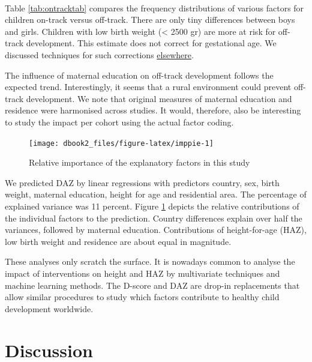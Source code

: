 \documentclass[
]{book}
\begin{document}
~

Table \ref{tab:ontracktab} compares the frequency distributions of various factors for children on-track versus off-track. There are only tiny differences between boys and girls. Children with low birth weight (\textless{} 2500 gr) are more at risk for off-track development. This estimate does not correct for gestational age. We discussed techniques for such corrections \href{https://d-score.org/dbook1/sec-pops.html}{elsewhere}.

The influence of maternal education on off-track development follows the expected trend. Interestingly, it seems that a rural environment could prevent off-track development. We note that original measures of maternal education and residence were harmonised across studies. It would, therefore, also be interesting to study the impact per cohort using the actual factor coding.

\begin{figure}

{\centering \texttt{[image: dbook2\_files/figure-latex/imppie-1]} 

}

\caption{Relative importance of the explanatory factors in this study}\label{fig:imppie}
\end{figure}



We predicted DAZ by linear regressions with predictors country, sex, birth weight, maternal education, height for age and residential area. The percentage of explained variance was 11 percent. Figure \ref{fig:imppie} depicts the relative contributions of the individual factors to the prediction. Country differences explain over half the variances, followed by maternal education. Contributions of height-for-age (HAZ), low birth weight and residence are about equal in magnitude.

These analyses only scratch the surface. It is nowadays common to analyse the impact of interventions on height and HAZ by multivariate techniques and machine learning methods. The D-score and DAZ are drop-in replacements that allow similar procedures to study which factors contribute to healthy child development worldwide.

\newpage

\hypertarget{ch:discussion2}{%
\chapter{Discussion}\label{ch:discussion2}}
\end{document}
